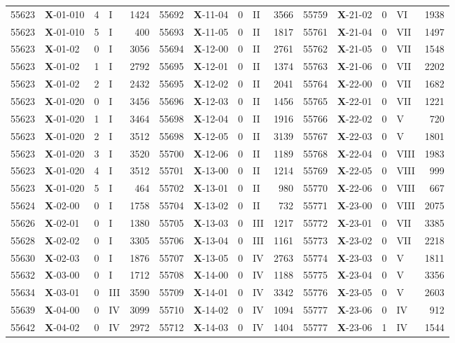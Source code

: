 \begin{table*}
\begin{tabular}{llllrllllrllllr}
55623&\textbf{X}-01-010&4&I&1424&55692&\textbf{X}-11-04&0&II&3566&55759&\textbf{X}-21-02&0&VI&1938\\
55623&\textbf{X}-01-010&5&I&400&55693&\textbf{X}-11-05&0&II&1817&55761&\textbf{X}-21-04&0&VII&1497\\
55623&\textbf{X}-01-02&0&I&3056&55694&\textbf{X}-12-00&0&II&2761&55762&\textbf{X}-21-05&0&VII&1548\\
55623&\textbf{X}-01-02&1&I&2792&55695&\textbf{X}-12-01&0&II&1374&55763&\textbf{X}-21-06&0&VII&2202\\
55623&\textbf{X}-01-02&2&I&2432&55695&\textbf{X}-12-02&0&II&2041&55764&\textbf{X}-22-00&0&VII&1682\\
55623&\textbf{X}-01-020&0&I&3456&55696&\textbf{X}-12-03&0&II&1456&55765&\textbf{X}-22-01&0&VII&1221\\
55623&\textbf{X}-01-020&1&I&3464&55698&\textbf{X}-12-04&0&II&1916&55766&\textbf{X}-22-02&0&V&720\\
55623&\textbf{X}-01-020&2&I&3512&55698&\textbf{X}-12-05&0&II&3139&55767&\textbf{X}-22-03&0&V&1801\\
55623&\textbf{X}-01-020&3&I&3520&55700&\textbf{X}-12-06&0&II&1189&55768&\textbf{X}-22-04&0&VIII&1983\\
55623&\textbf{X}-01-020&4&I&3512&55701&\textbf{X}-13-00&0&II&1214&55769&\textbf{X}-22-05&0&VIII&999\\
55623&\textbf{X}-01-020&5&I&464&55702&\textbf{X}-13-01&0&II&980&55770&\textbf{X}-22-06&0&VIII&667\\
55624&\textbf{X}-02-00&0&I&1758&55704&\textbf{X}-13-02&0&II&732&55771&\textbf{X}-23-00&0&VIII&2075\\
55626&\textbf{X}-02-01&0&I&1380&55705&\textbf{X}-13-03&0&III&1217&55772&\textbf{X}-23-01&0&VII&3385\\
55628&\textbf{X}-02-02&0&I&3305&55706&\textbf{X}-13-04&0&III&1161&55773&\textbf{X}-23-02&0&VII&2218\\
55630&\textbf{X}-02-03&0&I&1876&55707&\textbf{X}-13-05&0&IV&2763&55774&\textbf{X}-23-03&0&V&1811\\
55632&\textbf{X}-03-00&0&I&1712&55708&\textbf{X}-14-00&0&IV&1188&55775&\textbf{X}-23-04&0&V&3356\\
55634&\textbf{X}-03-01&0&III&3590&55709&\textbf{X}-14-01&0&IV&3342&55776&\textbf{X}-23-05&0&V&2603\\
55639&\textbf{X}-04-00&0&IV&3099&55710&\textbf{X}-14-02&0&IV&1094&55777&\textbf{X}-23-06&0&IV&912\\
55642&\textbf{X}-04-02&0&IV&2972&55712&\textbf{X}-14-03&0&IV&1404&55777&\textbf{X}-23-06&1&IV&1544\\

\end{tabular}
\end{table*}
